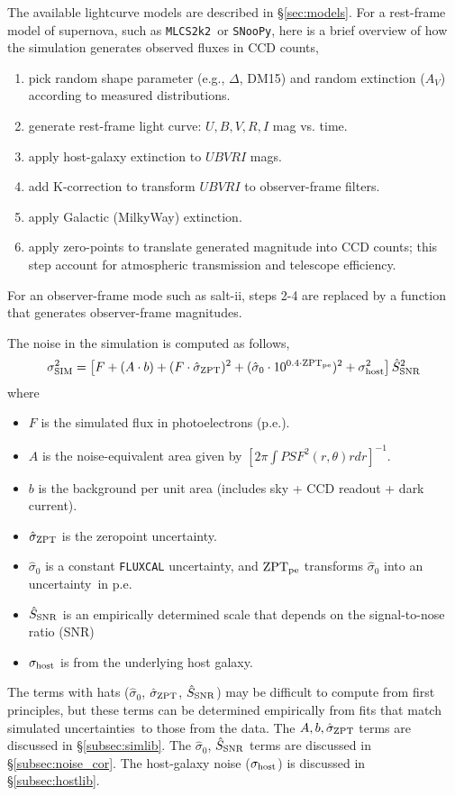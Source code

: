 \documentclass[12pt]{article}
\newcommand{\unc}{uncertainty}
\newcommand{\uncs}{uncertainties}
\newcommand{\mlcs}{{\tt MLCS2k2}}
\newcommand{\SALTII}{{\sc salt-ii}}
\newcommand{\snoopy}{{\tt SNooPy}}
\newcommand{\eff}{efficiency}
\newcommand{\sigSIM}{\sigma_{\rm SIM}}
\newcommand{\sigZPT}{\hat\sigma_{\rm ZPT}}
\newcommand{\sigOFF}{\hat\sigma_0}
\newcommand{\sigHOST}{\sigma_{\rm host}}
\newcommand{\SSNR}{\hat{S}_{\rm SNR}}
\newcommand{\ZPTpe}{{\rm ZPT}_{\rm pe}}
\begin{document}
{The available lightcurve models are described in \S\ref{sec:models}.
For a rest-frame model of supernova, such as \mlcs\ or \snoopy,
here is a brief overview of how the simulation generates
observed fluxes in CCD counts,
%
\begin{enumerate}
  \item	pick random shape parameter (e.g., $\Delta$, DM15) 
        and random extinction ($A_V$) according to measured 
        distributions.
  \item	generate rest-frame light curve: $U,B,V,R,I$ mag vs. time.
  \item	apply host-galaxy extinction to $UBVRI$ mags.
  \item	add K-correction to transform $UBVRI$  to observer-frame filters.
  \item	apply Galactic (MilkyWay) extinction.
  \item	apply zero-points to translate generated magnitude into
        CCD counts; this step account for atmospheric transmission
        and telescope \eff.
\end{enumerate}
%
For an observer-frame mode such as \SALTII,
steps 2-4 are replaced by a function that generates
observer-frame magnitudes.

The noise in the simulation is computed as follows,
\begin{equation}
  \sigSIM^2 = \left[ F + (A\cdot b) 
                 + (F\cdot\sigZPT)^2 
                 + (\sigOFF \cdot 10^{0.4\cdot\ZPTpe})^2
                 + \sigHOST^2
           \right]{\SSNR}^2
  \label{eq:noiseModel}
\end{equation}
%  
where 
\begin{itemize}
  \item $F$ is the simulated flux in photoelectrons (p.e.).
  \item $A$ is the noise-equivalent area given by 
        $[2\pi\int PSF^2(r,\theta) r dr]^{-1}$.
  \item  $b$ is the background per unit area 
         (includes sky + CCD readout + dark current).
  \item $\sigZPT$ is the zeropoint \unc.
  \item $\sigOFF$ is a constant {\tt FLUXCAL} \unc, and
    $\ZPTpe$ transforms $\sigOFF$ into an \unc\ in p.e.
  \item $\SSNR$ is an empirically determined scale that depends 
           on the signal-to-nose  ratio (SNR)
  \item $\sigHOST$ is from the underlying host galaxy.
\end{itemize}
%
The terms with hats ($\sigOFF$, $\sigZPT$, $\SSNR$)
may be difficult to compute from first principles,
but these terms can be determined empirically from 
fits that match simulated \uncs\ to those from the data.
The $A,b,\sigZPT$ terms are discussed in 
\S\ref{subsec:simlib}.
The $\sigOFF$, $\SSNR$ terms are discussed in 
\S\ref{subsec:noise_cor}.
The host-galaxy noise ($\sigHOST$) is discussed in
\S\ref{subsec:hostlib}.

}
\end{document}
